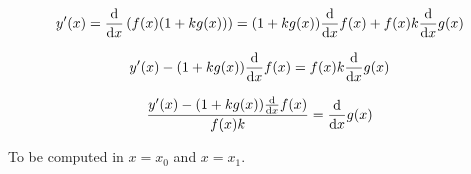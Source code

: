 \documentclass[a4paper, 12pt]{scrartcl}
\newcommand{\deriv}[1]{\ensuremath{\frac{\mathrm{d}}}{\mathrm{d}{#1}}}
\begin{document}
\[
 y^\prime(x) = \deriv{x}\left(f(x)(1 + kg(x))\right) = (1 + kg(x))\deriv{x}f(x) + f(x) k\deriv{x}g(x)
\]


\[
 y^\prime(x) - (1 + kg(x))\deriv{x}f(x) = f(x) k\deriv{x}g(x)
\]

\[
 \frac{y^\prime(x) - (1 + kg(x))\deriv{x}f(x)}{f(x) k} =\deriv{x}g(x)
\]

To be computed in $x=x_0$ and $x=x_1$.
\end{document}
